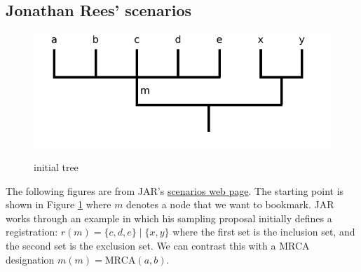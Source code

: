 \documentclass[11pt]{article}
\newcommand{\registration}[3]{{\ensuremath{r(#1)=\{#2\}\mid\{#3\}}}\xspace}
\newcommand{\mrcaDesig}[3]{{\ensuremath{m(#1)=\mbox{MRCA}(#2, #3)}}\xspace}
\begin{document}
\subsection{Jonathan Rees' scenarios}
\begin{figure}[h!]
   \centering \includegraphics[scale=.5]{images/jar-example.pdf}\\
   \caption{initial tree}\label{jarInitialTree}
\end{figure}
The following figures are from JAR's \href{https://rawgit.com/OpenTreeOfLife/reference-taxonomy/registry/registry/doc/scenarios.html}{scenarios web page}.
The starting point is shown in Figure \ref{jarInitialTree} where
$m$ denotes a node that we want to bookmark.
JAR works through an example in which his sampling proposal
  initially defines a registration: \registration{m}{c,d,e}{x,y} where the
  first set is the inclusion set, and the second set is the exclusion set.
We can contrast this with a MRCA designation \mrcaDesig{m}{a}{b}.
\end{document}
